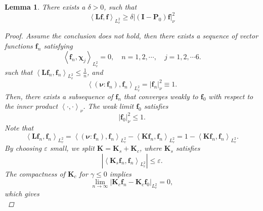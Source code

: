 \documentclass[reqno]{amsart}
\numberwithin{equation}{section}
\numberwithin{equation}{section}
\newtheorem{lema}[thm]{Lemma}
\begin{document}
	
	\begin{lema}\label{LeMcoevlem} 
		There exists a $\delta>0$, such that
		\begin{equation}\label{LeMcoev}
			\left\langle \mathbf{L}\mathbf{f}, \mathbf{f}  \right\rangle_{L_v^2}\geq \delta |(\mathbf{I}-\mathbf{P}_0)\mathbf{f}|^2_{\nu}
		\end{equation}
		\begin{proof}
			Assume the conclusion does not hold, then there exists a sequence of vector functions $\mathbf{f}_n$ satisfying 
			\begin{equation}\label{lem23hgnj0}
				\left\langle \mathbf{f}_n, \bm{\chi}_j   \right\rangle_{L_v^2}=0, \quad n=1,2,\cdots, \quad  j=1,2,\cdots 6.
			\end{equation}
			such that $\left\langle \mathbf{L}\mathbf{f}_n, \mathbf{f}_n  \right\rangle_{L_v^2}\leq \frac{1}{n}$, and 
			\begin{equation*}
				\left\langle (\bm{\nu}:\mathbf{f}_n), \mathbf{f}_n  \right\rangle_{L_v^2}=|\mathbf{f}_n|^2_{\nu} \equiv 1. 
			\end{equation*}
			Then, there exists a subsequence of $\mathbf{f}_n$
			that converges weakly to $\mathbf{f}_0$ with respect to the inner product $\left\langle \cdot, \cdot \right\rangle_{\nu}$. The weak limit $\mathbf{f}_0$ satisfies
			\begin{equation*}
				|\mathbf{f}_0|^2_{\nu} \leq 1.
			\end{equation*}
			Note that
			\begin{equation*}
				\left\langle \mathbf{L}\mathbf{f}_n, \mathbf{f}_n  \right\rangle_{L_v^2}=\left\langle (\bm{\nu}:\mathbf{f}_n), \mathbf{f}_n  \right\rangle_{L_v^2}-\left\langle \mathbf{K}\mathbf{f}_n, \mathbf{f}_n  \right\rangle_{L_v^2}=1-\left\langle \mathbf{K}\mathbf{f}_n, \mathbf{f}_n  \right\rangle_{L_v^2}. 
			\end{equation*}
			By choosing $\varepsilon$ small, we split $\mathbf{K}=\mathbf{K}_s+\mathbf{K}_c$, where $\mathbf{K}_s$ satisfies 
			\begin{equation*}
				|\left\langle \mathbf{K}_s\mathbf{f}_n, \mathbf{f}_n  \right\rangle_{L_v^2}|\leq \varepsilon.
			\end{equation*}
			The compactness of $\mathbf{K}_c$ for $\gamma\leq 0$ implies
			\begin{equation*}
				\lim_{n \to \infty}|\mathbf{K}_c\mathbf{f}_n-\mathbf{K}_c\mathbf{f}_0|_{L_v^2}=0,
			\end{equation*}
			which gives 
			\begin{equation*}

\end{equation*}
\end{proof}
\end{lema}
\end{document}
